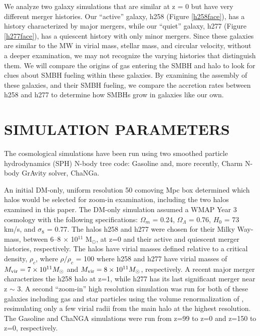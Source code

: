 \documentclass[12pt,headA,chapB]{fiskthesis}
\begin{document}
We analyze two galaxy simulations that are similar at z = 0 but have very different merger histories. Our ``active'' galaxy, h258 (Figure \ref{h258face}), has a history characterized by major mergers, while our ``quiet'' galaxy, h277 (Figure \ref{h277face}), has a quiescent history with only minor mergers. Since these galaxies are similar to the MW in virial mass, stellar mass, and circular velocity, without a deeper examination, we may not recognize the varying histories that distinguish them. We will compare the origins of gas entering the SMBH and halo to look for clues about SMBH fueling within these galaxies. By examining the assembly of these galaxies, and their SMBH fueling, we compare the accretion rates between h258 and h277 to determine how SMBHs grow in galaxies like our own.




\chapter{\normalsize SIMULATION PARAMETERS}
\thispagestyle{empty}

The cosmological simulations have been run using two smoothed particle hydrodynamics (SPH) N-body tree code: Gasoline \citep{Wadsley2004} and, more recently, Charm N-body GrAvity solver, ChaNGa. 

An initial DM-only, uniform resolution 50 comoving Mpc box determined which halos would be selected for zoom-in examination, including the two halos examined in this paper. The DM-only simulation assumed a WMAP Year 3 cosmology \citep{Spergel2007} with the following specifications: $\Omega _m$ = 0.24, $\Omega _{\Lambda}$ = 0.76, $H_0$ = 73 km/s, and $\sigma _8$ = 0.77. The halos h258 and h277  were chosen for their Milky Way-mass, between 6--8 $\times$ 10$^{11}$  M$_{\odot}$, at z=0 and their active and quiescent merger histories, respectively. The halos have virial masses defined relative to a critical density, $\rho _c$, where $\rho / \rho _c$ = 100 where h258 and h277 have virial masses of $M_{\rm vir} = 7 \times 10^{11} M_{\odot}$ and $M_{\rm vir} = 8 \times 10^{11} M_{\odot}$, respectively. A recent major merger characterizes the h258 halo at z=1, while h277 has its last significant merger near z $\sim$ 3. A second ``zoom-in'' high resolution simulation was run for both of these galaxies including gas and star particles using the volume renormalization of \cite{Katz1993}, resimulating only a few virial radii from the main halo at the highest resolution. The Gasoline and ChaNGA simulations were run from z=99 to z=0 and z=150 to z=0, respectively.  
\end{document}
